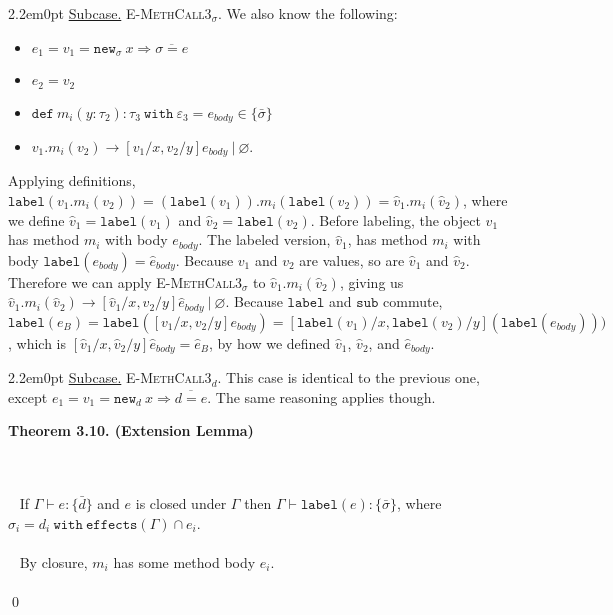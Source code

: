 \documentclass{llncs}
\newcommand{\keywadj}[1]{\mathtt{#1}}
\newcommand{\keyw}[1]{\keywadj{#1}~}
\newcommand{\kw}[1]{\keyw{ #1 }}
\newcommand{\kwa}[1]{\keywadj{ #1 }}
\newcommand{\thm}[3]{
	\begin{large}
		\bf{#1}
	\end{large} \\\\
	\fbox{Statement.} ~ #2
	\fbox{Proof.}~ #3 \qed
}
\newcommand{\subcase}[1] {
	\begin{adjustwidth}{2.2em}{0pt}
		\underline{Subcase.} #1
	\end{adjustwidth}
}
\newcommand{\type}[2]{
	#1~\keyw{with} #2
}
\newcommand{\newd}[0]{
	\keywadj{new}_d~x \Rightarrow \overline{d = e}
}
\newcommand{\newsig}[0]{
	\keywadj{new}_\sigma~x \Rightarrow \overline{\sigma = e}
}
\begin{document}
{{\subcase{ \textsc{E-MethCall3$_\sigma$}. We also know the following:
\begin{itemize}
	\item $e_1 = v_1 = \newsig$
	\item $e_2 = v_2$
	\item $\keywadj{def~} m_i(y : \tau_2) : \type{\tau_3}{\varepsilon_3} = e_{body} \in \{ \bar \sigma \}$
	\item $v_1.m_i(v_2) \longrightarrow [v_1/x, v_2/y]e_{body}~|~\varnothing$.
\end{itemize}
\noindent
Applying definitions, $\keywadj{label}(v_1.m_i(v_2)) = (\keywadj{label}(v_1)).m_i(\keywadj{label}(v_2)) = \hat v_1.m_i(\hat v_2)$, where we define $\hat v_1 = \kwa{label}(v_1)$ and $\hat v_2 = \kwa{label}(v_2)$. Before labeling, the object $v_1$ has method $m_i$ with body $e_{body}$. The labeled version, $\hat v_1$, has method $m_i$ with body $\keywadj{label}(e_{body}) = \hat e_{body}$. Because $v_1$ and $v_2$ are values, so are $\hat v_1$ and $\hat v_2$. Therefore we can apply \textsc{E-MethCall3$_\sigma$} to $\hat v_1.m_i(\hat v_2)$, giving us $\hat v_1.m_i(\hat v_2) \longrightarrow [\hat v_1 / x, \hat v_2 / y]\hat e_{body}~|~\varnothing$. Because $\keywadj{label}$ and $\keywadj{sub}$ commute, $\keywadj{label}(e_B) = \keywadj{label}([v_1/x, v_2/y]e_{body}) = [\keywadj{label}(v_1)/x, \keywadj{label}(v_2)/y](\keywadj{label}(e_{body})))$, which is $[\hat v_1/x, \hat v_2/y] \hat e_{body} = \hat e_B$, by how we defined $\hat v_1$, $\hat v_2$, and $\hat e_{body}$.\\
}


\subcase{ \textsc{E-MethCall3$_d$}.
This case is identical to the previous one, except $e_1 = v_1 = \newd$. The same reasoning applies though.
}

}
}







\thm{Theorem 3.10. (Extension Lemma)}
{If $\Gamma \vdash e : \{ \bar d \}$ and $e$ is closed under $\Gamma$ then $\Gamma \vdash \kwa{label}(e) : \{ \bar \sigma \}$, where $\sigma_i = d_i~\kw{with} \kwa{effects}(\Gamma) \cap e_i$.\\\\}
{By closure, $m_i$ has some method body $e_i$. \\\\}
\end{document}
